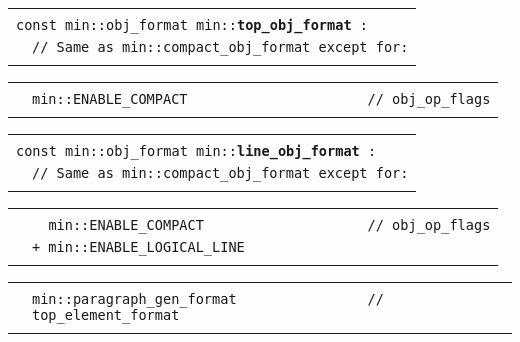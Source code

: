 \documentclass[12pt]{article}
\makeatletter
\newcommand{\TT}[1]{{\tt \bfseries #1}}
\newenvironment{indpar}[1][0.3in]%
	{\begin{list}{}%
		     {\setlength{\itemsep}{0in}%
		      \setlength{\topsep}{0in}%
		      \setlength{\parsep}{1ex}%
		      \setlength{\labelwidth}{#1}%
		      \setlength{\leftmargin}{#1}%
		      \addtolength{\leftmargin}{\labelsep}}%
	 \item}%
	{\end{list}}
\newcommand{\LABEL}[1]{\label{#1}}
\newlength{\ARGBREAKLENGTH}
\newcommand{\ARGBREAK}[1][\ARGBREAKLENGTH]{\\&\hspace*{#1}}
\newcommand{\MINLKEY}[2]%
           {\TT{#1#2}\index{min::#1@{\tt min::#1}!#2@{\tt #2}}%
                     \index{#1@{\tt #1}!#2@{\tt #2}}}
\makeatother
\begin{document}
\begin{indpar}[1em]

\begin{tabular}{r@{}l}\hspace*{0.1in} \\[-3ex]
\multicolumn{2}{l}{\tt const min::obj\_format
                   min::\MINLKEY{top}{\_obj\_format}:}%
\LABEL{MIN::TOP_OBJ_FORMAT}\ARGBREAK
\verb|// Same as min::compact_obj_format except for:|\ARGBREAK
\end{tabular}

\vspace{-4ex}\begin{tabular}{r@{}l}\hspace*{0.1in}\ARGBREAK
\verb|min::ENABLE_COMPACT                      // obj_op_flags|\ARGBREAK
\end{tabular}

\end{indpar}

\begin{indpar}[1em]

\begin{tabular}{r@{}l}\hspace*{0.1in} \\[-3ex]
\multicolumn{2}{l}{\tt const min::obj\_format
                   min::\MINLKEY{line}{\_obj\_format}:}%
\LABEL{MIN::LINE_OBJ_FORMAT}\ARGBREAK
\verb|// Same as min::compact_obj_format except for:|\ARGBREAK
\end{tabular}

\vspace{-4ex}\begin{tabular}{r@{}l}\hspace*{0.1in}\ARGBREAK
\verb|  min::ENABLE_COMPACT                    // obj_op_flags|\ARGBREAK
\verb|+ min::ENABLE_LOGICAL_LINE|\ARGBREAK
\end{tabular}

\vspace{-4ex}\begin{tabular}{r@{}l}\hspace*{0.1in}\ARGBREAK
\verb|min::paragraph_gen_format                // top_element_format|\ARGBREAK
\end{tabular}

\end{indpar}
\end{document}

